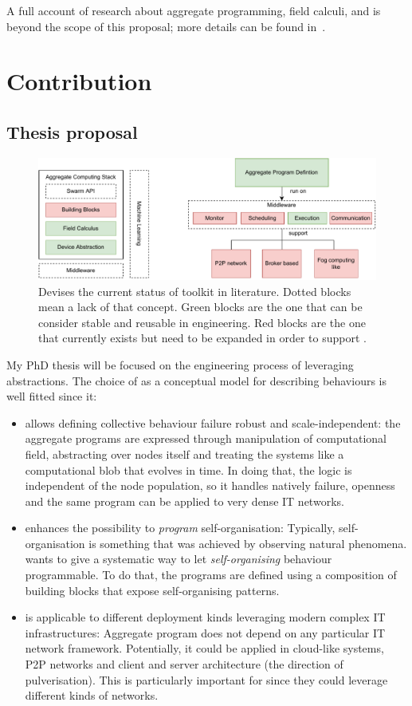 \documentclass[11pt]{article}
\begin{document}
A full account of research about aggregate programming, field calculi, and \scafi{} is beyond the scope of this proposal; more details can be found in~\cite{viroli2019jlamp-si-coord,DBLP:journals/eaai/CasadeiVAPD21}.

\section{Contribution} \label{contribution}
\subsection{Thesis proposal}
\begin{figure}
	\centering
	\includegraphics[width=\textwidth]{img/to-do-for-thesis.pdf}
	\caption{Devises the current status of \ac{} toolkit in literature. Dotted blocks mean a lack of that concept. Green blocks are the one that can be consider stable and reusable in \cpsw{} engineering. Red blocks are the one that currently exists but need to be expanded in order to support \cpsw{}.}
	\label{fig:current-state}
\end{figure}
My PhD thesis will be focused on the engineering process of \cpsw{} leveraging \ac{} abstractions. The choice of \ac{} as a conceptual model for describing \cpsw{} behaviours is well fitted since it:
\begin{itemize}
	\item allows defining collective behaviour failure robust and scale-independent: the aggregate programs are expressed through manipulation of computational field, abstracting over nodes itself and treating the systems like a computational blob that evolves in time. In doing that, the logic is independent of the node population, so it handles natively failure, openness and the same program can be applied to very dense IT networks.
	\item enhances the possibility to \textit{program} self-organisation: Typically, self-organisation is something that was achieved by observing natural phenomena. \ac{} wants to give a systematic way to let \textit{self-organising} behaviour programmable. To do that, the programs are defined using a composition of building blocks that expose self-organising patterns.
	\item is applicable to different deployment kinds leveraging modern complex IT infrastructures: Aggregate program does not depend on any particular IT network framework. Potentially, it could be applied in cloud-like systems, P2P networks and client and server architecture (the direction of pulverisation). This is particularly important for \cpsw{} since they could leverage different kinds of networks.
\end{itemize}
\end{document}
